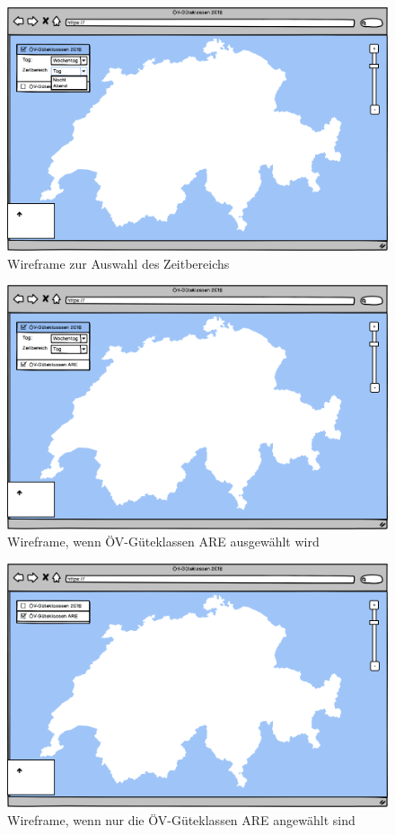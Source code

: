 \begin{figure}[p]
    \centering
    \includegraphics[width=0.8\linewidth]{projectdoc/img/wireframes/zeitbereich_auswahl.png}
    \caption[Wireframe zur Auswahl des Zeitbereichs]{Wireframe zur Auswahl des Zeitbereichs}
    \label{fig:wireframe_auswahl_zeitbereich}
\end{figure}

\begin{figure}[p]
    \centering
    \includegraphics[width=0.8\linewidth]{projectdoc/img/wireframes/are_selected.png}
    \caption[Wireframe, wenn ÖV-Güteklassen ARE ausgewählt wird]{Wireframe, wenn ÖV-Güteklassen ARE ausgewählt wird}
    \label{fig:wireframe_are_selected}
\end{figure}

\begin{figure}[p]
    \centering
    \includegraphics[width=0.8\linewidth]{projectdoc/img/wireframes/only_ARE.png}
    \caption[Wireframe, wenn nur die ÖV-Güteklassen ARE angewählt sind]{Wireframe, wenn nur die ÖV-Güteklassen ARE angewählt sind}
    \label{fig:wireframe_oevgk18_delesected}
\end{figure}


